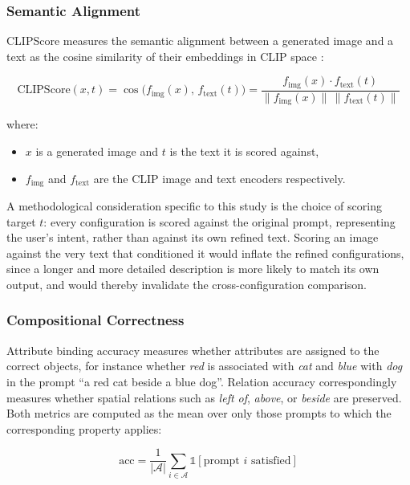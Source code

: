 \documentclass[a4paper,twoside,12pt]{report}
\begin{document}
\subsubsection{Semantic Alignment}

CLIPScore measures the semantic alignment between a generated image and a text
as the cosine similarity of their embeddings in CLIP space \citep{radford2021clip}:

\begin{equation}
\mathrm{CLIPScore}(x, t)
= \cos\!\big(f_{\mathrm{img}}(x),\, f_{\mathrm{text}}(t)\big)
= \frac{f_{\mathrm{img}}(x) \cdot f_{\mathrm{text}}(t)}
       {\lVert f_{\mathrm{img}}(x)\rVert\,\lVert f_{\mathrm{text}}(t)\rVert}
\label{eq:clipscore}
\end{equation}

where:
\begin{itemize}
  \item \(x\) is a generated image and \(t\) is the text it is scored against,
  \item \(f_{\mathrm{img}}\) and \(f_{\mathrm{text}}\) are the CLIP image and
        text encoders respectively.
\end{itemize}

A methodological consideration specific to this study is the choice of scoring
target \(t\): every configuration is scored against the original prompt,
representing the user's intent, rather than against its own refined text.
Scoring an image against the very text that conditioned it would inflate the
refined configurations, since a longer and more detailed description is more
likely to match its own output, and would thereby invalidate the
cross-configuration comparison.

\subsubsection{Compositional Correctness}

Attribute binding accuracy measures whether attributes are assigned to the
correct objects, for instance whether \emph{red} is associated with \emph{cat}
and \emph{blue} with \emph{dog} in the prompt ``a red cat beside a blue dog''.
Relation accuracy correspondingly measures whether spatial relations such as
\emph{left of}, \emph{above}, or \emph{beside} are preserved. Both metrics are
computed as the mean over only those prompts to which the corresponding property
applies:

\begin{equation}
\mathrm{acc}
= \frac{1}{|\mathcal{A}|}
  \sum_{i \in \mathcal{A}} \mathbb{1}\!\left[\text{prompt } i \text{ satisfied}\right]
\label{eq:accuracy}
\end{equation}
\end{document}

